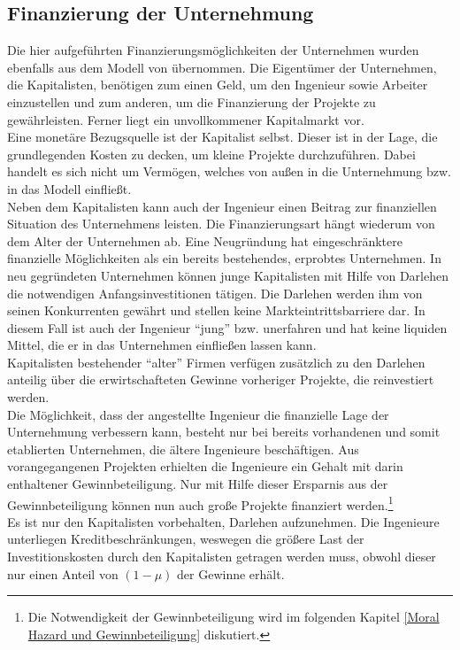 \subsection{Finanzierung der Unternehmung}
Die hier aufgeführten Finanzierungsmöglichkeiten der Unternehmen wurden ebenfalls aus dem Modell von \cite{Acemoglu.2006} übernommen.
Die Eigentümer der Unternehmen, die Kapitalisten, benötigen zum einen Geld, um den Ingenieur sowie Arbeiter einzustellen und zum anderen, um die Finanzierung der Projekte zu gewährleisten. Ferner liegt ein unvollkommener Kapitalmarkt vor. \\
%
Eine monetäre Bezugsquelle ist der Kapitalist selbst. Dieser ist in der Lage, die grundlegenden Kosten zu decken, um kleine Projekte durchzuführen. Dabei handelt es sich nicht um Vermögen, welches von außen in die Unternehmung bzw. in das Modell einfließt. \\
%
Neben dem Kapitalisten kann auch der Ingenieur einen Beitrag zur finanziellen Situation des Unternehmens leisten. Die Finanzierungsart hängt wiederum von dem Alter der Unternehmen ab. Eine Neugründung hat eingeschränktere finanzielle Möglichkeiten als ein bereits bestehendes, erprobtes Unternehmen. In neu gegründeten Unternehmen können junge Kapitalisten  mit Hilfe von Darlehen die notwendigen Anfangsinvestitionen tätigen. Die Darlehen werden ihm von seinen Konkurrenten gewährt und stellen keine Markteintrittsbarriere dar. In diesem Fall ist auch der Ingenieur "`jung"' bzw. unerfahren und hat keine liquiden Mittel, die er in das Unternehmen einfließen lassen kann.\\
%
Kapitalisten bestehender "`alter"' Firmen verfügen zusätzlich zu den Darlehen anteilig über die erwirtschafteten Gewinne vorheriger Projekte, die reinvestiert werden.\\
%
Die Möglichkeit, dass der angestellte Ingenieur die finanzielle Lage der Unternehmung verbessern kann, besteht nur bei bereits vorhandenen und somit etablierten Unternehmen, die ältere Ingenieure beschäftigen. Aus vorangegangenen Projekten erhielten die Ingenieure ein Gehalt mit darin enthaltener Gewinnbeteiligung. Nur mit Hilfe dieser Ersparnis aus der Gewinnbeteiligung können nun auch große Projekte finanziert werden.\footnote{Die Notwendigkeit der Gewinnbeteiligung wird im folgenden Kapitel \ref{Moral Hazard und Gewinnbeteiligung} diskutiert.}\\
%
Es ist nur den Kapitalisten vorbehalten, Darlehen aufzunehmen. Die Ingenieure unterliegen Kreditbeschränkungen, weswegen die größere Last der Investitionskosten durch den Kapitalisten getragen werden muss, obwohl dieser nur einen Anteil von $(1-\mu)$  der Gewinne erhält. 
%
